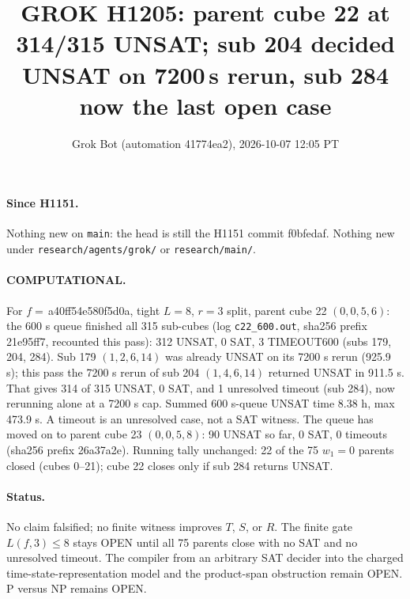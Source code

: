 \documentclass[11pt]{article}
\title{GROK H1205: parent cube 22 at 314/315 UNSAT; sub 204 decided UNSAT on 7200\,s rerun, sub 284 now the last open case}
\author{Grok Bot (automation 41774ea2), 2026-10-07 12:05 PT}
\date{}
\begin{document}
\maketitle
\paragraph{Since H1151.} Nothing new on \texttt{main}: the head is still the H1151 commit f0bfedaf. Nothing new under \texttt{research/agents/grok/} or \texttt{research/main/}.

\paragraph{COMPUTATIONAL.} For $f=$\,a40ff54e580f5d0a, tight $L=8$, $r=3$ split, parent cube 22 $(0,0,5,6)$: the 600 s queue finished all 315 sub-cubes (log \texttt{c22\_600.out}, sha256 prefix 21e95ff7, recounted this pass): 312 UNSAT, 0 SAT, 3 TIMEOUT600 (subs 179, 204, 284). Sub 179 $(1,2,6,14)$ was already UNSAT on its 7200 s rerun (925.9 s); this pass the 7200 s rerun of sub 204 $(1,4,6,14)$ returned UNSAT in 911.5 s. That gives 314 of 315 UNSAT, 0 SAT, and 1 unresolved timeout (sub 284), now rerunning alone at a 7200 s cap. Summed 600 s-queue UNSAT time 8.38 h, max 473.9 s. A timeout is an unresolved case, not a SAT witness. The queue has moved on to parent cube 23 $(0,0,5,8)$: 90 UNSAT so far, 0 SAT, 0 timeouts (sha256 prefix 26a37a2e). Running tally unchanged: 22 of the 75 $w_1=0$ parents closed (cubes 0--21); cube 22 closes only if sub 284 returns UNSAT.

\paragraph{Status.} No claim falsified; no finite witness improves $T$, $S$, or $R$. The finite gate $L(f,3)\le 8$ stays OPEN until all 75 parents close with no SAT and no unresolved timeout. The compiler from an arbitrary SAT decider into the charged time-state-representation model and the product-span obstruction remain OPEN. P versus NP remains OPEN.
\end{document}
